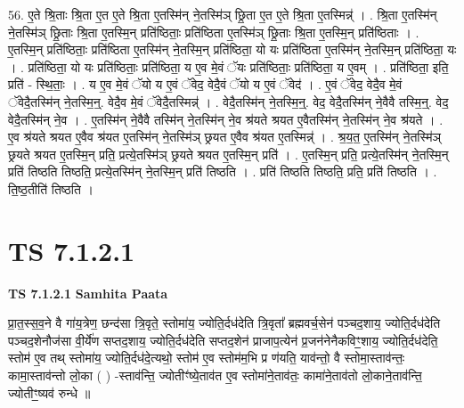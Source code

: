 \documentclass[17pt]{extarticle}
\begin{document}
56. ए॒ते श्रि॒ताः श्रि॒ता ए॒त ए॒ते श्रि॒ता ए॒तस्मि॑न् ने॒तस्मि॑ञ् छ्रि॒ता ए॒त ए॒ते श्रि॒ता ए॒तस्मिन्न्॑ । . श्रि॒ता ए॒तस्मि॑न् ने॒तस्मि॑ञ् छ्रि॒ताः श्रि॒ता ए॒तस्मि॒न् प्रति॑ष्ठिताः॒ प्रति॑ष्ठिता ए॒तस्मि॑ञ् छ्रि॒ताः श्रि॒ता ए॒तस्मि॒न् प्रति॑ष्ठिताः । . ए॒तस्मि॒न् प्रति॑ष्ठिताः॒ प्रति॑ष्ठिता ए॒तस्मि॑न् ने॒तस्मि॒न् प्रति॑ष्ठिता॒ यो यः प्रति॑ष्ठिता ए॒तस्मि॑न् ने॒तस्मि॒न् प्रति॑ष्ठिता॒ यः । . प्रति॑ष्ठिता॒ यो यः प्रति॑ष्ठिताः॒ प्रति॑ष्ठिता॒ य ए॒व मे॒वं ॅयः प्रति॑ष्ठिताः॒ प्रति॑ष्ठिता॒ य ए॒वम् । . प्रति॑ष्ठिता॒ इति॒ प्रति॑ - स्थि॒ताः॒ । . य ए॒व मे॒वं ॅयो य ए॒वं ॅवेद॒ वेदै॒वं ॅयो य ए॒वं ॅवेद॑ । . ए॒वं ॅवेद॒ वेदै॒व मे॒वं ॅवेदै॒तस्मि॑न् ने॒तस्मि॒न्॒. वेदै॒व मे॒वं ॅवेदै॒तस्मिन्न्॑ । . वेदै॒तस्मि॑न् ने॒तस्मि॒न्॒. वेद॒ वेदै॒तस्मि॑न् ने॒वैवै तस्मि॒न्॒. वेद॒ वेदै॒तस्मि॑न् ने॒व । . ए॒तस्मि॑न् ने॒वैवै तस्मि॑न् ने॒तस्मि॑न् ने॒व श्र॑यते श्रयत ए॒वैतस्मि॑न् ने॒तस्मि॑न् ने॒व श्र॑यते । . ए॒व श्र॑यते श्रयत ए॒वैव श्र॑यत ए॒तस्मि॑न् ने॒तस्मि॑ञ् छ्रयत ए॒वैव श्र॑यत ए॒तस्मिन्न्॑ । . श्र॒य॒त॒ ए॒तस्मि॑न् ने॒तस्मि॑ञ् छ्रयते श्रयत ए॒तस्मि॒न् प्रति॒ प्रत्ये॒तस्मि॑ञ् छ्रयते श्रयत ए॒तस्मि॒न् प्रति॑ । . ए॒तस्मि॒न् प्रति॒ प्रत्ये॒तस्मि॑न् ने॒तस्मि॒न् प्रति॑ तिष्ठति तिष्ठति॒ प्रत्ये॒तस्मि॑न् ने॒तस्मि॒न् प्रति॑ तिष्ठति । . प्रति॑ तिष्ठति तिष्ठति॒ प्रति॒ प्रति॑ तिष्ठति । . ति॒ष्ठ॒तीति॑ तिष्ठति । \newline
\pagebreak
{}

\section{ TS 7.1.2.1 }

\textbf{TS 7.1.2.1 } \newline
\textbf{Samhita Paata} \newline

प्रा॒त॒स्स॒व॒ने वै गा॑य॒त्रेण॒ छन्द॑सा त्रि॒वृते॒ स्तोमा॑य॒ ज्योति॒र्दध॑देति त्रि॒वृता᳚ ब्रह्मवर्च॒सेन॑ पञ्चद॒शाय॒ ज्योति॒र्दध॑देति पञ्चद॒शेनौज॑सा वी॒र्ये॑ण सप्तद॒शाय॒ ज्योति॒र्दध॑देति सप्तद॒शेन॑ प्राजाप॒त्येन॑ प्र॒जन॑नेनैकविꣳ॒॒शाय॒ ज्योति॒र्दध॑देति॒ स्तोम॑ ए॒व तथ् स्तोमा॑य॒ ज्योति॒र्दध॑दे॒त्यथो॒ स्तोम॑ ए॒व स्तोम॑म॒भि प्र ण॑यति॒ याव॑न्तो॒ वै स्तोमा॒स्ताव॑न्तः॒ कामा॒स्ताव॑न्तो लो॒का ( ) -स्ताव॑न्ति॒ ज्योतीꣳ॑ष्ये॒ताव॑त ए॒व स्तोमा॑ने॒ताव॑तः॒ कामा॑ने॒ताव॑तो लो॒काने॒ताव॑न्ति॒ ज्योतीꣳ॒॒ष्यव॑ रुन्धे ॥ \newline
\end{document}
